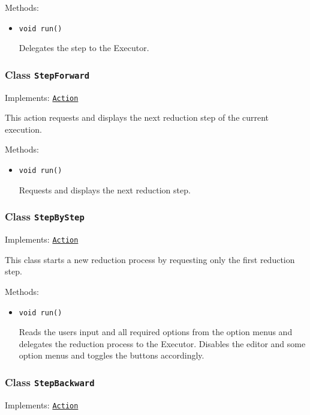 Methods:
\begin{itemize}
\item \texttt{void run()}

Delegates the step to the Executor.

\end{itemize}

\subsubsection{Class \texttt{StepForward}}
\label{type:edu.kit.wavelength.client.view.action.StepForward}
Implements: \texttt{\hyperref[type:edu.kit.wavelength.client.view.action.Action]{Action}}

This action requests and displays the next reduction step of the current
 execution.

Methods:
\begin{itemize}
\item \texttt{void run()}

Requests and displays the next reduction step.

\end{itemize}

\subsubsection{Class \texttt{StepByStep}}
\label{type:edu.kit.wavelength.client.view.action.StepByStep}
Implements: \texttt{\hyperref[type:edu.kit.wavelength.client.view.action.Action]{Action}}

This class starts a new reduction process by requesting only the first
 reduction step.

Methods:
\begin{itemize}
\item \texttt{void run()}

Reads the users input and all required options from the option menus and
 delegates the reduction process to the Executor. Disables
 the editor and some option menus and toggles the buttons accordingly.

\end{itemize}

\subsubsection{Class \texttt{StepBackward}}
\label{type:edu.kit.wavelength.client.view.action.StepBackward}
Implements: \texttt{\hyperref[type:edu.kit.wavelength.client.view.action.Action]{Action}}

